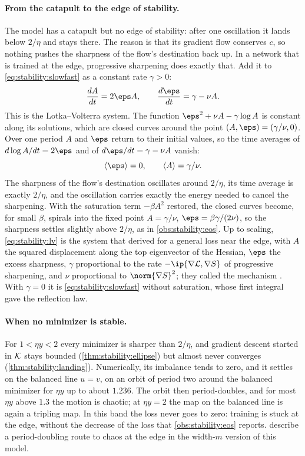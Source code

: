 \begin{refsection}
\paragraph{From the catapult to the edge of stability.} The model has a catapult but no edge of stability: after one oscillation it lands below $2/\eta$ and stays there. The reason is that its gradient flow conserves $c$, so nothing pushes the sharpness of the flow's destination back up. In a network that is trained at the edge, progressive sharpening does exactly that. Add it to \eqref{eq:stability:slowfast} as a constant rate $\gamma>0$:
\begin{equation}\label{eq:stability:lv}
  \frac{dA}{dt}=2\eps A,\qquad \frac{d\eps}{dt}=\gamma-\nu A .
\end{equation}
This is the Lotka--Volterra system. The function $\eps^2+\nu A-\gamma\log A$ is constant along its solutions, which are closed curves around the point $(A,\eps)=(\gamma/\nu,0)$. Over one period $A$ and $\eps$ return to their initial values, so the time averages of $d\log A/dt=2\eps$ and of $d\eps/dt=\gamma-\nu A$ vanish:
\[
  \langle\eps\rangle=0,\qquad \langle A\rangle=\gamma/\nu .
\]
The sharpness of the flow's destination oscillates around $2/\eta$, its time average is exactly $2/\eta$, and the oscillation carries exactly the energy needed to cancel the sharpening. With the saturation term $-\beta A^2$ restored, the closed curves become, for small $\beta$, spirals into the fixed point $A=\gamma/\nu$, $\eps=\beta\gamma/(2\nu)$, so the sharpness settles slightly above $2/\eta$, as in \cref{obs:stability:eos}. Up to scaling, \eqref{eq:stability:lv} is the system that \textcite{DamianNichaniLee2023} derived for a general loss near the edge, with $A$ the squared displacement along the top eigenvector of the Hessian, $\eps$ the excess sharpness, $\gamma$ proportional to the rate $-\ip{\nabla\Loss,\nabla S}$ of progressive sharpening, and $\nu$ proportional to $\norm{\nabla S}^2$; they called the mechanism . With $\gamma=0$ it is \eqref{eq:stability:slowfast} without saturation, whose first integral gave the reflection law.

\paragraph{When no minimizer is stable.} For $1<\eta y<2$ every minimizer is sharper than $2/\eta$, and gradient descent started in $\mathcal{K}$ stays bounded (\cref{thm:stability:ellipse}) but almost never converges (\cref{thm:stability:landing}). Numerically, its imbalance tends to zero, and it settles on the balanced line $u=v$, on an orbit of period two around the balanced minimizer for $\eta y$ up to about $1.236$. The orbit then period-doubles, and for most $\eta y$ above $1.3$ the motion is chaotic; at $\eta y=2$ the map on the balanced line is again a tripling map. In this band the loss never goes to zero: training is stuck at the edge, without the decrease of the loss that \cref{obs:stability:eos} reports. \Textcite{KalraHeBarkeshli2025} describe a period-doubling route to chaos at the edge in the width-$m$ version of this model.


\end{refsection}
